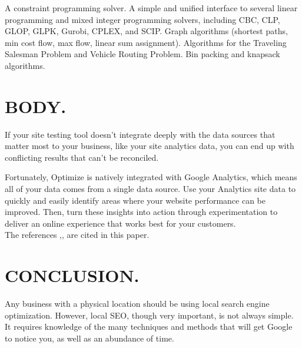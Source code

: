 \documentclass[09pt,a4paper]{article}
\begin{document}
A constraint programming solver.
A simple and unified interface to several linear programming and mixed integer programming solvers, including CBC, CLP, GLOP, GLPK, Gurobi, CPLEX, and SCIP.
Graph algorithms (shortest paths, min cost flow, max flow, linear sum assignment).
Algorithms for the Traveling Salesman Problem and Vehicle Routing Problem.
Bin packing and knapsack algorithms.

\section{BODY.}
If your site testing tool doesn’t integrate deeply with the data sources that matter most to your business, like your site analytics data, you can end up with conflicting results that can’t be reconciled.

Fortunately, Optimize is natively integrated with Google Analytics, which means all of your data comes from a single data source. Use your Analytics site data to quickly and easily identify areas where your website performance can be improved. Then, turn these insights into action through experimentation to deliver an online experience that works best for your customers.\\
The references \cite{gill1981practical},\cite{fischer1992special},\cite{micheli1994synthesis} are cited in this paper.
\section{CONCLUSION.}
Any business with a physical location should be using local search engine optimization. However, local SEO, though very important, is not always simple. It requires knowledge of the many techniques and methods that will get Google to notice you, as well as an abundance of time.


\end{document}
